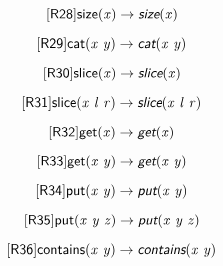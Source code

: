 \documentclass[10pt,leqno,fleqn]{article}
\newcommand{\artVariable}[1]{\mbox{\em #1\/}}
\newcommand{\artConstructor}[1]{\mbox{\sf #1}}
\newcommand{\artSpecial}[1]{\mbox{\sf\em #1}}
\begin{document}
\begin{equation}
\tag*{[\artConstructor{\sf R28}]}\artConstructor{\sf size}(\artVariable{x})\rightarrow \artSpecial{size}(\artVariable{x})
\end{equation}

\begin{equation}
\tag*{[\artConstructor{\sf R29}]}\artConstructor{\sf cat}(\artVariable{x}\ \artVariable{y})\rightarrow \artSpecial{cat}(\artVariable{x}\ \artVariable{y})
\end{equation}

\begin{equation}
\tag*{[\artConstructor{\sf R30}]}\artConstructor{\sf slice}(\artVariable{x})\rightarrow \artSpecial{slice}(\artVariable{x})
\end{equation}

\begin{equation}
\tag*{[\artConstructor{\sf R31}]}\artConstructor{\sf slice}(\artVariable{x}\ \artVariable{l}\ \artVariable{r})\rightarrow \artSpecial{slice}(\artVariable{x}\ \artVariable{l}\ \artVariable{r})
\end{equation}

\begin{equation}
\tag*{[\artConstructor{\sf R32}]}\artConstructor{\sf get}(\artVariable{x})\rightarrow \artSpecial{get}(\artVariable{x})
\end{equation}

\begin{equation}
\tag*{[\artConstructor{\sf R33}]}\artConstructor{\sf get}(\artVariable{x}\ \artVariable{y})\rightarrow \artSpecial{get}(\artVariable{x}\ \artVariable{y})
\end{equation}

\begin{equation}
\tag*{[\artConstructor{\sf R34}]}\artConstructor{\sf put}(\artVariable{x}\ \artVariable{y})\rightarrow \artSpecial{put}(\artVariable{x}\ \artVariable{y})
\end{equation}

\begin{equation}
\tag*{[\artConstructor{\sf R35}]}\artConstructor{\sf put}(\artVariable{x}\ \artVariable{y}\ \artVariable{z})\rightarrow \artSpecial{put}(\artVariable{x}\ \artVariable{y}\ \artVariable{z})
\end{equation}

\begin{equation}
\tag*{[\artConstructor{\sf R36}]}\artConstructor{\sf contains}(\artVariable{x}\ \artVariable{y})\rightarrow \artSpecial{contains}(\artVariable{x}\ \artVariable{y})
\end{equation}
\end{document}
